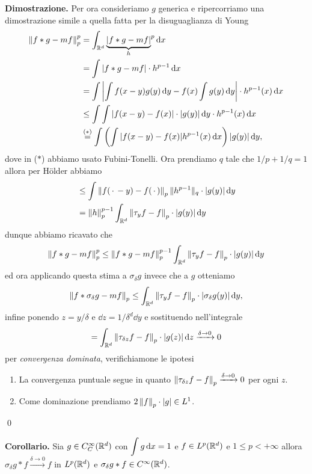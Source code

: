 \textbf{Dimostrazione.}
Per ora consideriamo $g$ generica e ripercorriamo una dimostrazione simile a quella fatta per la disuguaglianza di Young
$$
\begin{aligned}
	\left\lVert f \ast g - m f \right\rVert_p^p 
	&= \int_{\mathbb R^d} {\underbrace{|f \ast g - m f|}_h}^p \,\mathrm{d} x \\
	&= \int |f \ast g - m f| \cdot h^{p-1} \,\mathrm{d} x \\
	&= \int \left| \int f(x - y) g(y) \,\mathrm{d} y - f(x) \int g(y) \,\mathrm{d} y \right| \cdot h^{p-1}(x) \,\mathrm{d} x \\
	&\leq \int \int |f(x - y) - f(x)| \cdot |g(y)| \,\mathrm{d} y \cdot h^{p-1}(x) \,\mathrm{d} x \\
	&\overset{\text{($*$)}}{=} \int \left(\int |f(x - y) - f(x)| h^{p-1}(x) \,\mathrm{d} x \right) |g(y)| \,\mathrm{d} y,
\end{aligned}
$$
dove in ($*$) abbiamo usato Fubini-Tonelli. Ora prendiamo $q$ tale che $1/p + 1/q = 1$ allora per H\"older abbiamo
$$
\begin{aligned}
	&\leq \int \left\lVert f(\,\cdot\, - y) - f(\,\cdot\,) \right\rVert_p \| h^{p-1} \|_q \cdot |g(y)| \,\mathrm{d} y \\
	&= \left\lVert h \right\rVert_p^{p-1} \int_{\mathbb R^d} \left\lVert \tau_y f - f \right\rVert_p \cdot |g(y)| \,\mathrm{d} y \\
\end{aligned}
$$
dunque abbiamo ricavato che
$$
\left\lVert f \ast g - m f \right\rVert_p^p 
\leq \left\lVert f \ast g - m f \right\rVert_p^{p-1} \int_{\mathbb R^d} \left\lVert \tau_y f - f \right\rVert_p \cdot |g(y)| \,\mathrm{d} y
$$
ed ora applicando questa stima a $\sigma_\delta g$ invece che a $g$ otteniamo
$$
\left\lVert f \ast \sigma_\delta g - m f \right\rVert_p
\leq \int_{\mathbb R^d} \left\lVert \tau_y f - f \right\rVert_p \cdot |\sigma_\delta g(y)| \,\mathrm{d} y,
$$
infine ponendo $z = y / \delta$ e $\dd z = 1/\delta^d \dd y$ e sostituendo nell'integrale
$$
= \int_{\mathbb R^d} \left\lVert \tau_{\delta z} f - f \right\rVert_p \cdot |g(z)| \,\mathrm{d} z \xrightarrow{\delta \to 0} 0
$$
per \textit{convergenza dominata}, verifichiamone le ipotesi
\begin{enumerate}
	\item La convergenza puntuale segue in quanto $\left\lVert \tau_{\delta z} f - f \right\rVert_p \xrightarrow{\delta \to 0} 0$ per ogni $z$.
	\item Come dominazione prendiamo $2 \left\lVert f \right\rVert_p \cdot |g| \in L^1$.
\end{enumerate}
\qed

\textbf{Corollario.}
Sia $g \in C_C^\infty(\mathbb R^d)$ con $\displaystyle \int g \,\mathrm{d} x = 1$ e $f \in L^p(\mathbb R^d)$ e $1 \leq p < +\infty$ allora $\sigma_\delta g \ast f \xrightarrow{\delta \to 0} f$ in $L^p(\mathbb R^d)$ e $\sigma_\delta g \ast f \in C^\infty(\mathbb R^d)$.

